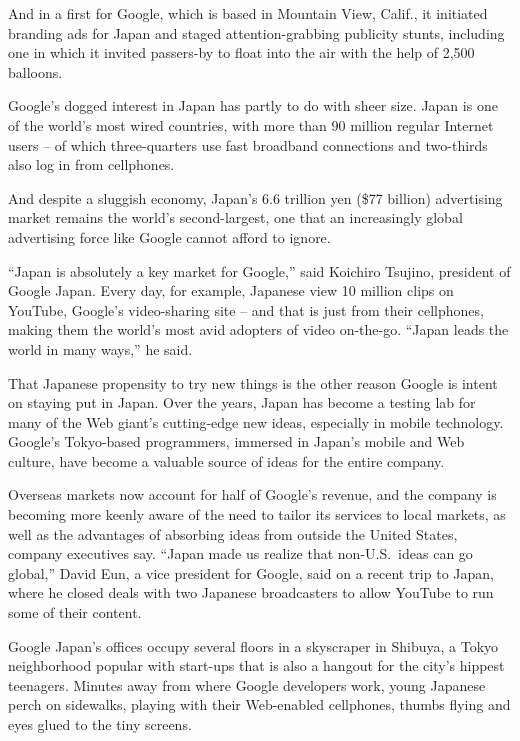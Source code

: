 ﻿\documentclass[12pt]{article}
\begin{document}
And in a first for Google, which is based in Mountain View, Calif., it initiated branding ads for
Japan and staged attention-grabbing publicity stunts, including one in which it invited passers-by
to float into the air with the help of 2,500 balloons.

Google's dogged interest in Japan has partly to do with sheer size. Japan is one of the world's most
wired countries, with more than 90 million regular Internet users -- of which three-quarters use
fast broadband connections and two-thirds also log in from cellphones.

And despite a sluggish economy, Japan's 6.6 trillion yen (\$77 billion) advertising market remains
the world's second-largest, one that an increasingly global advertising force like Google cannot
afford to ignore.

``Japan is absolutely a key market for Google,'' said Koichiro Tsujino, president of Google Japan.
Every day, for example, Japanese view 10 million clips on YouTube, Google's video-sharing site --
and that is just from their cellphones, making them the world's most avid adopters of video
on-the-go. ``Japan leads the world in many ways,'' he said.

That Japanese propensity\cite{propensity} to try new things is the other reason Google is intent on
staying put in Japan. Over the years, Japan has become a testing lab for many of the Web giant's
cutting-edge new ideas, especially in mobile technology. Google's Tokyo-based programmers, immersed
in Japan's mobile and Web culture, have become a valuable source of ideas for the entire company.

Overseas markets now account for half of Google's revenue, and the company is becoming more keenly
aware of the need to tailor its services to local markets, as well as the advantages of absorbing
ideas from outside the United States, company executives say. ``Japan made us realize that
non-U.S.~ideas can go global,'' David Eun, a vice president for Google, said on a recent trip to
Japan, where he closed deals with two Japanese broadcasters to allow YouTube to run some of their
content.

Google Japan's offices occupy several floors in a skyscraper in Shibuya, a Tokyo neighborhood
popular with start-ups that is also a hangout for the city's hippest teenagers. Minutes away from
where Google developers work, young Japanese perch on sidewalks, playing with their Web-enabled
cellphones, thumbs flying and eyes glued to the tiny screens.
\end{document}
